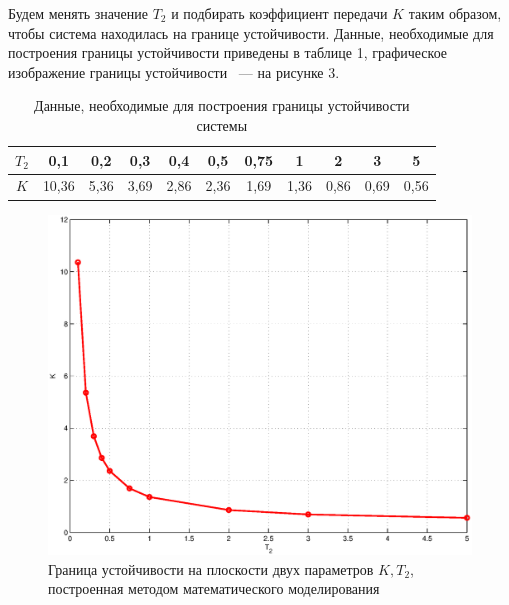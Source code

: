 \documentclass[12pt,a4paper]{article}
\begin{document}
Будем менять значение $T_2$ и подбирать коэффициент передачи $K$ таким образом, чтобы система находилась на границе устойчивости. Данные, необходимые для построения границы устойчивости приведены в таблице 1, графическое изображение границы устойчивости ~--- на рисунке 3.
\begin{table}[h!]
	\caption{Данные, необходимые для построения границы устойчивости системы}
	\renewcommand{\arraystretch}{1.8} %
	\begin{center}
		\begin{tabular}{|c|c|c|c|c|c|c|c|c|c|c|}
			\hline $T_2$ & 0,1 & 0,2 & 0,3 & 0,4 & 0,5 & 0,75 & 1 & 2 & 3 & 5\\
			\hline $K$ & 10,36 & 5,36 & 3,69 & 2,86 & 2,36 & 1,69 & 1,36 & 0,86 & 0,69 & 0,56\\
			\hline
		\end{tabular}	
	\end{center}	
\end{table} 
\begin{figure}[h!]
	\centering
	\includegraphics[width=0.8\linewidth]{scheme8lab/plot0.eps}
	\caption{Граница устойчивости на плоскости двух параметров $K, T_2$, построенная методом математического моделирования}
\end{figure}
\end{document}
